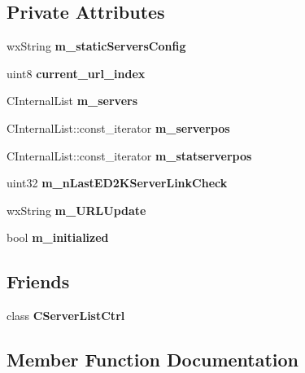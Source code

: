 \subsection*{Private Attributes}
\begin{DoxyCompactItemize}
\item 
wxString {\bfseries m\_\-staticServersConfig}\label{classCServerList_abcb40012d1a9b982ee5b5b033356d4b8}

\item 
uint8 {\bfseries current\_\-url\_\-index}\label{classCServerList_a8d478f406cff832c945d8e5f3a235fed}

\item 
CInternalList {\bfseries m\_\-servers}\label{classCServerList_afbdd8bf67be1a404f8eeeeef4b386790}

\item 
CInternalList::const\_\-iterator {\bfseries m\_\-serverpos}\label{classCServerList_a54a8f66e477ed7cf1838c237106c8d1a}

\item 
CInternalList::const\_\-iterator {\bfseries m\_\-statserverpos}\label{classCServerList_ad4ae8d085d2015a2cee0b63569e275d2}

\item 
uint32 {\bfseries m\_\-nLastED2KServerLinkCheck}\label{classCServerList_a9dc7834ff46ea4c2f15fe8e56d82ab31}

\item 
wxString {\bfseries m\_\-URLUpdate}\label{classCServerList_ae915963abe24eaa64520af28666ea19d}

\item 
bool {\bfseries m\_\-initialized}\label{classCServerList_a0250e5d141432c8e055b7fbc099444d6}

\end{DoxyCompactItemize}
\subsection*{Friends}
\begin{DoxyCompactItemize}
\item 
class {\bf CServerListCtrl}\label{classCServerList_a7c1360ef7ffe151b7936124f65ebdbef}

\end{DoxyCompactItemize}


\subsection{Member Function Documentation}
